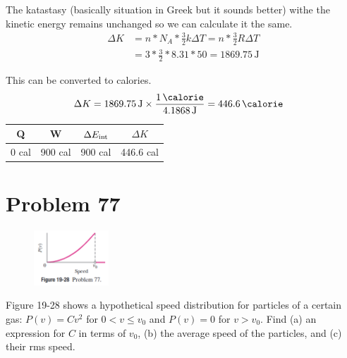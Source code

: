 \documentclass[12pt]{article}
\begin{document}
            The katastasy (basically situation in Greek but it sounds better) withe the kinetic energy remains unchanged so we can calculate it the same.
            \begin{align}
                \Delta K    &=  n * N_A * \frac{3}{2}k \Delta T
                    =   n * \frac{3}{2}R \Delta T\\
                    &=  3 * \frac{3}{2} * 8.31 * 50
                    =   1869.75\,\unit{\joule}
            \end{align}

            This can be converted to calories.
            \begin{align}
                \Delta K    &=  1869.75\,\unit{\joule} \times \frac{1\,\unit{\calorie}}{4.1868\,\unit{\joule}}
                    =   446.6\,\unit{\calorie}
            \end{align}

            \begin{center}
                \begin{tabular}{c | c | c | c}
                    Q   &   W   &   $\Delta E_{\rm int}$    &   $\Delta K$\\
                    \hline
                    0 cal   &   900 cal &   900 cal   &   446.6 cal
                \end{tabular}
            \end{center}

    \pagebreak
    \section{Problem 77}
        \begin{figure}
            \vspace{-30pt}
            \includegraphics[width=0.25\textwidth]{picture_19-28.png} 
        \end{figure}
        Figure 19-28 shows a hypothetical speed distribution for particles of a certain gas: $P(v) = Cv^2$ for $0 < v \leq v_0$ and $P(v) = 0$ for $v > v_0$.
        Find (a) an expression for $C$ in terms of $v_0$, (b) the average speed of the particles, and (c) their rms speed.
\end{document}

